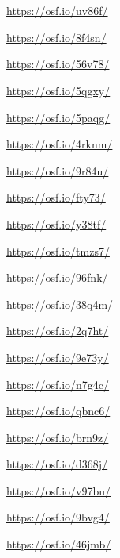 \section*{}
\begin{multicols}{2}
\begin{description}[font=\normalfont]
\item[\autoref{fig:claroPRESEEAmontana}:] \url{https://osf.io/uv86f/}
\item[\autoref{fig:claroPRESEEAnochebuena}:] \url{https://osf.io/8f4sn/}
\item[\autoref{fig:claroPRESEEAozono}:] \url{https://osf.io/56v78/}
\item[\autoref{fig:claroPRESEEAlipotimias}:] \url{https://osf.io/5qgxy/}
\item[\autoref{fig:claroPRESEEAmuyduro}:] \url{https://osf.io/5paqg/}
\item[\autoref{fig:claroPRESEEAingresos}:] \url{https://osf.io/4rknm/}
\item[\autoref{fig:claroPRESEEAnieve}:] \url{https://osf.io/9r84u/}
\item[\autoref{fig:claroPRESEEAloteria}:] \url{https://osf.io/fty73/}
\item[\autoref{fig:claroPRESEEAazar}:] \url{https://osf.io/y38tf/}
\item[\autoref{fig:claroPRESEEAirya}:] \url{https://osf.io/tmzs7/}
\item[\autoref{fig:claroPRESEEAcabeceraLONG}:] \url{https://osf.io/96fnk/}
\item[\autoref{fig:claroPRESEEAconoces}:] \url{https://osf.io/38q4m/}
\item[\autoref{fig:claroPRESEEAcompenetraros}:] \url{https://osf.io/2q7ht/}
\item[\autoref{fig:hombrePRESEEAhuevo}:] \url{https://osf.io/9e73y/}
\item[\autoref{fig:hombrePRESEEAciudad}:] \url{https://osf.io/n7g4c/}
\item[\autoref{fig:hombrePRESEEAinstituto}:] \url{https://osf.io/qbnc6/}
\item[\autoref{fig:hombrePRESEEAheterogeneo}:] \url{https://osf.io/brn9z/}
\item[\autoref{fig:hombrePRESEEAVizcaya}:] \url{https://osf.io/d368j/}
\item[\autoref{fig:hombrePRESEEAmadre}:] \url{https://osf.io/v97bu/}
\item[\autoref{fig:hombrePRESEEAdependia}:] \url{https://osf.io/9bvg4/}
\item[\autoref{fig:hombrePRESEEAdiferencia}:] \url{https://osf.io/46jmb/}

\end{description}
\end{multicols}
